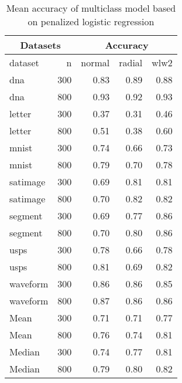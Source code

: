 \begin{table}[ht]
\centering
\begin{tabular}{lrrrr}
  \hline \multicolumn{2}{|c|}{Datasets} & \multicolumn{3}{c|}{Accuracy} \\ \hline
 \hline
dataset & n & normal & radial & wlw2 \\ 
  \hline \hline
dna & 300 & 0.83 & 0.89 & 0.88 \\ 
  dna & 800 & 0.93 & 0.92 & 0.93 \\ 
  letter & 300 & 0.37 & 0.31 & 0.46 \\ 
  letter & 800 & 0.51 & 0.38 & 0.60 \\ 
  mnist & 300 & 0.74 & 0.66 & 0.73 \\ 
  mnist & 800 & 0.79 & 0.70 & 0.78 \\ 
  satimage & 300 & 0.69 & 0.81 & 0.81 \\ 
  satimage & 800 & 0.70 & 0.82 & 0.82 \\ 
  segment & 300 & 0.69 & 0.77 & 0.86 \\ 
  segment & 800 & 0.70 & 0.80 & 0.86 \\ 
  usps & 300 & 0.78 & 0.66 & 0.78 \\ 
  usps & 800 & 0.81 & 0.69 & 0.82 \\ 
  waveform & 300 & 0.86 & 0.86 & 0.85 \\ 
  waveform & 800 & 0.87 & 0.86 & 0.86 \\ 
\hline 
  Mean & 300 & 0.71 & 0.71 & 0.77 \\ 
  Mean & 800 & 0.76 & 0.74 & 0.81 \\ 
\hline
  Median & 300 & 0.74 & 0.77 & 0.81 \\ 
  Median & 800 & 0.79 & 0.80 & 0.82 \\ 
   \hline
\end{tabular}
\caption{Mean accuracy of multiclass model based on penalized logistic regression} 
\label{glm1-multi1}
\end{table}
